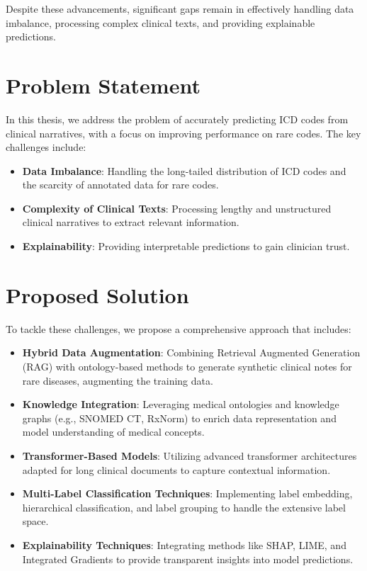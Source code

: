 Despite these advancements, significant gaps remain in effectively handling data imbalance, processing complex clinical texts, and providing explainable predictions.

\section{Problem Statement}
In this thesis, we address the problem of accurately predicting ICD codes from clinical narratives, with a focus on improving performance on rare codes. The key challenges include:
\begin{itemize}
    \item \textbf{Data Imbalance}: Handling the long-tailed distribution of ICD codes and the scarcity of annotated data for rare codes.
    \item \textbf{Complexity of Clinical Texts}: Processing lengthy and unstructured clinical narratives to extract relevant information.
    \item \textbf{Explainability}: Providing interpretable predictions to gain clinician trust.
\end{itemize}

\section{Proposed Solution}
To tackle these challenges, we propose a comprehensive approach that includes:
\begin{itemize}
    \item \textbf{Hybrid Data Augmentation}: Combining Retrieval Augmented Generation (RAG) with ontology-based methods to generate synthetic clinical notes for rare diseases, augmenting the training data.
    \item \textbf{Knowledge Integration}: Leveraging medical ontologies and knowledge graphs (e.g., SNOMED CT, RxNorm) to enrich data representation and model understanding of medical concepts.
    \item \textbf{Transformer-Based Models}: Utilizing advanced transformer architectures adapted for long clinical documents to capture contextual information.
    \item \textbf{Multi-Label Classification Techniques}: Implementing label embedding, hierarchical classification, and label grouping to handle the extensive label space.
    \item \textbf{Explainability Techniques}: Integrating methods like SHAP, LIME, and Integrated Gradients to provide transparent insights into model predictions.
\end{itemize}

